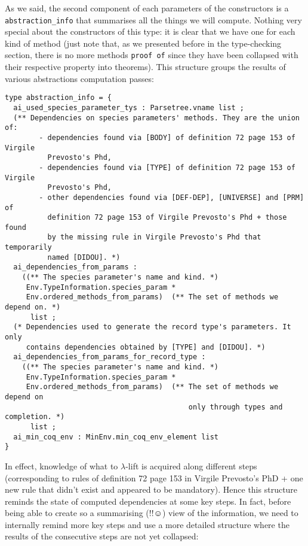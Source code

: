 As we said, the second component of each parameters of the
constructors is a {\tt abstraction\_info} that summarises all the
things we will compute. Nothing very special about the constructors of
this type: it is clear that we have one for each kind of method (just
note that, as we presented before in the type-checking section, there
is no more methods {\tt proof of} since they have been collapsed with
their respective property into theorems). This structure groups the
results of various abstractions computation passes:

{\footnotesize
\begin{lstlisting}[language=MyOCaml]
type abstraction_info = {
  ai_used_species_parameter_tys : Parsetree.vname list ;
  (** Dependencies on species parameters' methods. They are the union of:
        - dependencies found via [BODY] of definition 72 page 153 of Virgile
          Prevosto's Phd,
        - dependencies found via [TYPE] of definition 72 page 153 of Virgile
          Prevosto's Phd,
        - other dependencies found via [DEF-DEP], [UNIVERSE] and [PRM] of
          definition 72 page 153 of Virgile Prevosto's Phd + those found
          by the missing rule in Virgile Prevosto's Phd that temporarily
          named [DIDOU]. *)
  ai_dependencies_from_params :
    ((** The species parameter's name and kind. *)
     Env.TypeInformation.species_param *
     Env.ordered_methods_from_params)  (** The set of methods we depend on. *)
      list ;
  (* Dependencies used to generate the record type's parameters. It only
     contains dependencies obtained by [TYPE] and [DIDOU]. *)
  ai_dependencies_from_params_for_record_type :
    ((** The species parameter's name and kind. *)
     Env.TypeInformation.species_param *
     Env.ordered_methods_from_params)  (** The set of methods we depend on
                                           only through types and completion. *)
      list ;
  ai_min_coq_env : MinEnv.min_coq_env_element list
}
\end{lstlisting}}

In effect, knowledge of what to $\lambda$-lift is acquired along
different steps (corresponding to rules of definition 72 page 153 in
Virgile Prevosto's PhD + one new rule that didn't exist and appeared
to be mandatory). Hence this structure reminds the state of computed
dependencies at some key steps. In fact, before being able to create
so a summarising (!!$\smiley$) view of the information, we need to
internally remind more key steps and use a more detailed structure
where the results of the consecutive steps are not yet collapsed:

